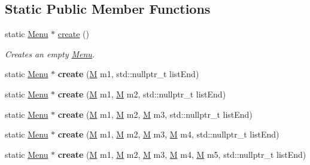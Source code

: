 \subsection*{Static Public Member Functions}
\begin{DoxyCompactItemize}
\item 
\mbox{\label{classMenu_a4924b955f2f21b5d725ce73f88a597a6}} 
static \hyperlink{classMenu}{Menu} $\ast$ \hyperlink{classMenu_a4924b955f2f21b5d725ce73f88a597a6}{create} ()
\begin{DoxyCompactList}\small\item\em Creates an empty \hyperlink{classMenu}{Menu}. \end{DoxyCompactList}\item 
\mbox{\label{classMenu_a97edcb72ebe24315e0b465279c0f6ee5}} 
static \hyperlink{classMenu}{Menu} $\ast$ {\bfseries create} (\hyperlink{classMenuItem}{M} m1, std\+::nullptr\+\_\+t list\+End)
\item 
\mbox{\label{classMenu_a421c34c2d1622966557947cc37e11e75}} 
static \hyperlink{classMenu}{Menu} $\ast$ {\bfseries create} (\hyperlink{classMenuItem}{M} m1, \hyperlink{classMenuItem}{M} m2, std\+::nullptr\+\_\+t list\+End)
\item 
\mbox{\label{classMenu_adb6a256ccb1d925bc520bb9f8896d048}} 
static \hyperlink{classMenu}{Menu} $\ast$ {\bfseries create} (\hyperlink{classMenuItem}{M} m1, \hyperlink{classMenuItem}{M} m2, \hyperlink{classMenuItem}{M} m3, std\+::nullptr\+\_\+t list\+End)
\item 
\mbox{\label{classMenu_a3cf059365eccbd9ef7f45b6b650da0c9}} 
static \hyperlink{classMenu}{Menu} $\ast$ {\bfseries create} (\hyperlink{classMenuItem}{M} m1, \hyperlink{classMenuItem}{M} m2, \hyperlink{classMenuItem}{M} m3, \hyperlink{classMenuItem}{M} m4, std\+::nullptr\+\_\+t list\+End)
\item 
\mbox{\label{classMenu_a0cad749f0f81f8774a82bbce34b2f680}} 
static \hyperlink{classMenu}{Menu} $\ast$ {\bfseries create} (\hyperlink{classMenuItem}{M} m1, \hyperlink{classMenuItem}{M} m2, \hyperlink{classMenuItem}{M} m3, \hyperlink{classMenuItem}{M} m4, \hyperlink{classMenuItem}{M} m5, std\+::nullptr\+\_\+t list\+End)
\item 

\end{DoxyCompactItemize}
